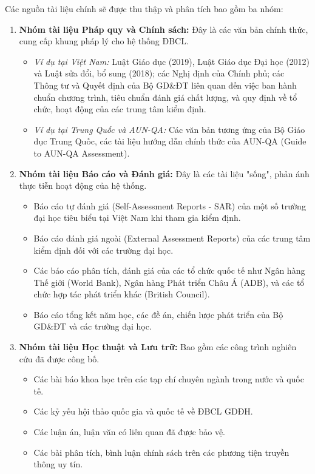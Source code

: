 \documentclass[12pt, a4paper, openany]{report}
\begin{document}
Các nguồn tài liệu chính sẽ được thu thập và phân tích bao gồm ba nhóm:
\begin{enumerate}
    \item \textbf{Nhóm tài liệu Pháp quy và Chính sách:} Đây là các văn bản chính thức, cung cấp khung pháp lý cho hệ thống ĐBCL.
    \begin{itemize}
        \item \textit{Ví dụ tại Việt Nam:} Luật Giáo dục (2019), Luật Giáo dục Đại học (2012) và Luật sửa đổi, bổ sung (2018); các Nghị định của Chính phủ; các Thông tư và Quyết định của Bộ GD\&ĐT liên quan đến việc ban hành chuẩn chương trình, tiêu chuẩn đánh giá chất lượng, và quy định về tổ chức, hoạt động của các trung tâm kiểm định.
        \item \textit{Ví dụ tại Trung Quốc và AUN-QA:} Các văn bản tương ứng của Bộ Giáo dục Trung Quốc, các tài liệu hướng dẫn chính thức của AUN-QA (Guide to AUN-QA Assessment).
    \end{itemize}
    
    \item \textbf{Nhóm tài liệu Báo cáo và Đánh giá:} Đây là các tài liệu "sống", phản ánh thực tiễn hoạt động của hệ thống.
    \begin{itemize}
        \item Báo cáo tự đánh giá (Self-Assessment Reports - SAR) của một số trường đại học tiêu biểu tại Việt Nam khi tham gia kiểm định.
        \item Báo cáo đánh giá ngoài (External Assessment Reports) của các trung tâm kiểm định đối với các trường đại học.
        \item Các báo cáo phân tích, đánh giá của các tổ chức quốc tế như Ngân hàng Thế giới (World Bank), Ngân hàng Phát triển Châu Á (ADB), và các tổ chức hợp tác phát triển khác (British Council).
        \item Báo cáo tổng kết năm học, các đề án, chiến lược phát triển của Bộ GD\&ĐT và các trường đại học.
    \end{itemize}
    
    \item \textbf{Nhóm tài liệu Học thuật và Lưu trữ:} Bao gồm các công trình nghiên cứu đã được công bố.
    \begin{itemize}
        \item Các bài báo khoa học trên các tạp chí chuyên ngành trong nước và quốc tế.
        \item Các kỷ yếu hội thảo quốc gia và quốc tế về ĐBCL GDĐH.
        \item Các luận án, luận văn có liên quan đã được bảo vệ.
        \item Các bài phân tích, bình luận chính sách trên các phương tiện truyền thông uy tín.
    \end{itemize}
\end{enumerate}
\end{document}
